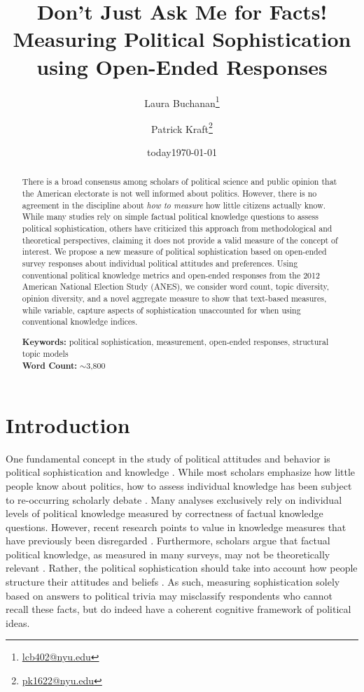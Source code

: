 \documentclass[12pt]{article}
\author{Laura Buchanan\footnote{\href{mailto:lcb402@nyu.edu}{lcb402@nyu.edu}} \and Patrick Kraft\footnote{\href{mailto:pk1622@nyu.edu}{pk1622@nyu.edu}}}
\date{today}
\title{Don't Just Ask Me for Facts!\\
\large{Measuring Political Sophistication using Open-Ended Responses}}
\date{\today}
\begin{document}
\maketitle\doublespacing\thispagestyle{empty}

\begin{abstract}
There is a broad consensus among scholars of political science and public opinion that the American electorate is not well informed about politics. However, there is no agreement in the discipline about \textit{how to measure} how little citizens actually know. While many studies rely on simple factual political knowledge questions to assess political sophistication, others have criticized this approach from methodological and theoretical perspectives, claiming it does not provide a valid measure of the concept of interest. We propose a new measure of political sophistication based on open-ended survey responses about individual political attitudes and preferences. Using conventional political knowledge metrics and open-ended responses from the 2012 American National Election Study (ANES), we consider word count, topic diversity, opinion diversity, and a novel aggregate measure to show that text-based measures, while variable, capture aspects of sophistication unaccounted for when using conventional knowledge indices.  


\vspace{\baselineskip}
\noindent \textbf{Keywords:} political sophistication, measurement, open-ended responses, structural topic models \\

\noindent \textbf{Word Count:} $\sim$3,800
\end{abstract}
\newpage\setcounter{page}{1}



\section{Introduction}

One fundamental concept in the study of political attitudes and behavior is political sophistication and knowledge \citep{converse1964nature,carpini1996americans}. While most scholars emphasize how little people know about politics, how to assess individual knowledge has been subject to re-occurring scholarly debate \citep[e.g.][]{mondak2000reconsidering,mondak2001asked,sturgis2008experiment,debell2013harder,pietryka2013analysis}. Many analyses exclusively rely on individual levels of political knowledge measured by correctness of factual knowledge questions. However, recent research points to value in knowledge measures that have previously been disregarded 
\citep{barabas2014question}. Furthermore, scholars argue that factual political knowledge, as measured in many surveys, may not be theoretically relevant \citep{lupia2006elitism}. Rather, the political sophistication should take into account how people structure their attitudes and beliefs 
\citep[e.g.][]{luskin1987measuring}. As such, measuring sophistication solely based on answers to political trivia may misclassify respondents who cannot recall these facts, but do indeed have a coherent cognitive framework of political ideas.
\end{document}

